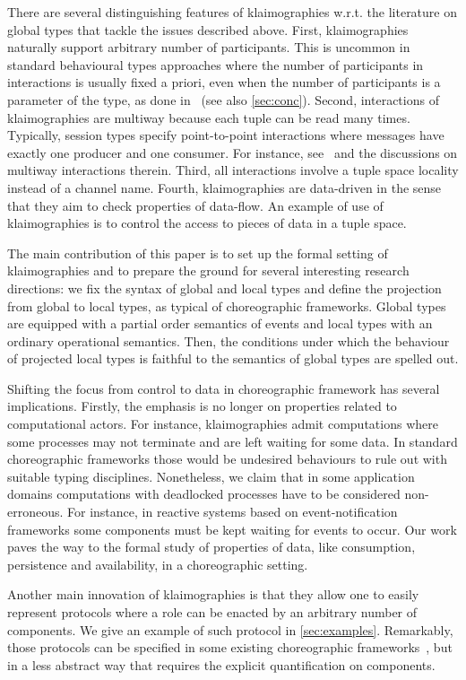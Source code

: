There are several distinguishing features of klaimographies w.r.t.
the literature on global types that tackle the issues described above.
%
First, klaimographies naturally support arbitrary number of
participants.
%
This is uncommon in standard behavioural types approaches where the
number of participants in interactions is usually fixed a priori, even
when the number of participants is a parameter of the type, as done
in~\cite{ydbh10} (see also \cref{sec:conc}).
%
Second, interactions of klaimographies are multiway because each tuple
can be read many times.
%
Typically, session types specify point-to-point interactions where
messages have exactly one producer and one consumer.
%
For instance, see~\cite{cdp12} and the discussions on multiway
interactions therein.
%
Third, all interactions involve a tuple space locality instead of a
channel name.
%
Fourth, klaimographies are data-driven in the sense that they
aim to check properties of data-flow.
%
An example of use of klaimographies is to control the access to pieces
of data in a tuple space.

The main contribution of this paper is to set up the formal setting of
klaimographies and to prepare the ground for several interesting
research directions: we fix the syntax of global and local types and
define the projection from global to local types, as typical of
choreographic frameworks.  Global types are equipped with a partial
order semantics of events and local types with an ordinary operational
semantics. Then, the conditions under which the behaviour of projected
local types is faithful to the semantics of global types are spelled
out.

Shifting the focus from control to data in choreographic framework has
several implications.
%
Firstly, the emphasis is no longer on properties related to
computational actors.
%
For instance, klaimographies admit computations where some processes
may not terminate and are left waiting for some data.
%
In standard choreographic frameworks those would be undesired behaviours
to rule out with suitable typing disciplines.
%
Nonetheless, we claim that in some application domains computations with
deadlocked processes have to be considered non-erroneous.
%
For instance, in reactive systems based on event-notification
frameworks some  components must be kept waiting for
events to occur.
%
Our work paves the way to the formal study of properties of data, like consumption, persistence and availability, in a choreographic setting.

Another main innovation of klaimographies is that they allow one to
easily represent protocols where a role can be enacted by an arbitrary
number of components.
%
We give an example of such protocol in \cref{sec:examples}.
%
Remarkably, those protocols can be specified in some existing
choreographic frameworks~\cite{ydbh10,chjny19}, but in a less abstract way
that requires the explicit quantification on components.

